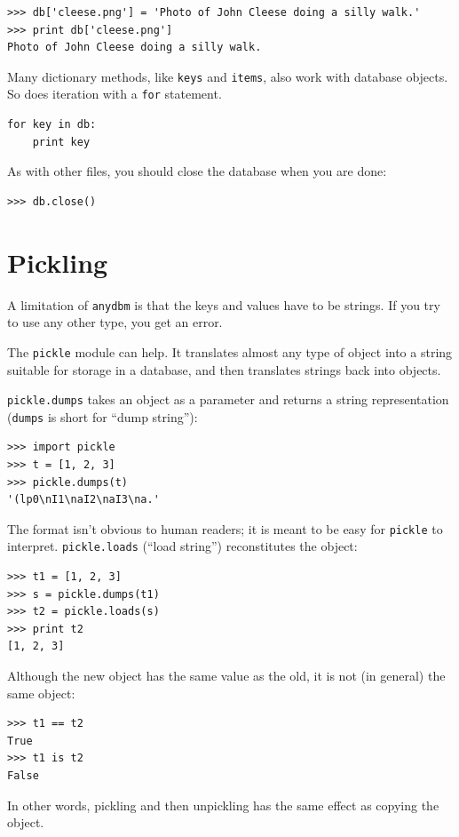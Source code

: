 \documentclass[10pt]{book}
\begin{document}
\begin{CJK}{UTF8}{gbsn}
\begin{verbatim}
>>> db['cleese.png'] = 'Photo of John Cleese doing a silly walk.'
>>> print db['cleese.png']
Photo of John Cleese doing a silly walk.
\end{verbatim}
%
Many dictionary methods, like {\tt keys} and {\tt items}, also
work with database objects.  So does iteration with a {\tt for}
statement.

\begin{verbatim}
for key in db:
    print key
\end{verbatim}
%
As with other files, you should close the database when you are
done:

\begin{verbatim}
>>> db.close()
\end{verbatim}
%


\section{Pickling}

A limitation of {\tt anydbm} is that the keys and values have
to be strings.  If you try to use any other type, you get an
error.

The {\tt pickle} module can help.  It translates
almost any type of object into a string suitable for storage in a
database, and then translates strings back into objects.

{\tt pickle.dumps} takes an object as a parameter and returns
a string representation ({\tt dumps} is short for ``dump string''):

\begin{verbatim}
>>> import pickle
>>> t = [1, 2, 3]
>>> pickle.dumps(t)
'(lp0\nI1\naI2\naI3\na.'
\end{verbatim}
%
The format isn't obvious to human readers; it is meant to be
easy for {\tt pickle} to interpret.  {\tt pickle.loads}
(``load string'') reconstitutes the object:

\begin{verbatim}
>>> t1 = [1, 2, 3]
>>> s = pickle.dumps(t1)
>>> t2 = pickle.loads(s)
>>> print t2
[1, 2, 3]
\end{verbatim}
%
Although the new object has the same value as the old, it is
not (in general) the same object:

\begin{verbatim}
>>> t1 == t2
True
>>> t1 is t2
False
\end{verbatim}
%
In other words, pickling and then unpickling has the same effect
as copying the object.


\end{CJK}
\end{document}
